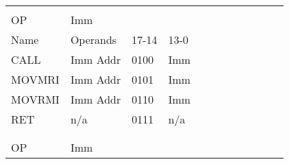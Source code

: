 \documentclass[a4paper]{article}
\begin{document}
\begin{tabular}{|l|l|l|l|l|l|l|l|l|l|l|l|}
\hline
&&&&&&&&&
&&\\
\hline
&&&&&&&&&
&&\\
\hline
OP&Imm&&&&&&&&
&&\\
\hline
Name&Operands&17-14&13-0&&&&&&
&&\\
\hline
CALL&Imm Addr&0100&Imm&&&&&&
&&\\
\hline
MOVMRI&Imm Addr&0101&Imm&&&&&&
&&\\
\hline
MOVRMI&Imm Addr&0110&Imm&&&&&&
&&\\
\hline
RET&n/a&0111&n/a&&&&&&
&&\\
\hline
&&&&&&&&&
&&\\
\hline
&&&&&&&&&
&&\\
\hline
OP&Imm&&&&&&&&
&&\\
\hline
\end{tabular}
\newline
\end{document}
